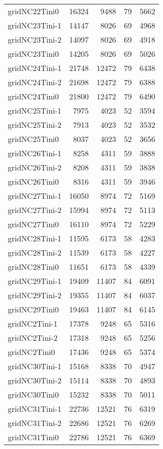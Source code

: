 \begin{longtable}{lrrrr}
gridNC22Tini0 & 16324 & 9488 & 79 & 5662 \\
gridNC23Tini-1 & 14147 & 8026 & 69 & 4968 \\
gridNC23Tini-2 & 14097 & 8026 & 69 & 4918 \\
gridNC23Tini0 & 14205 & 8026 & 69 & 5026 \\
gridNC24Tini-1 & 21748 & 12472 & 79 & 6438 \\
gridNC24Tini-2 & 21698 & 12472 & 79 & 6388 \\
gridNC24Tini0 & 21800 & 12472 & 79 & 6490 \\
gridNC25Tini-1 & 7975 & 4023 & 52 & 3594 \\
gridNC25Tini-2 & 7913 & 4023 & 52 & 3532 \\
gridNC25Tini0 & 8037 & 4023 & 52 & 3656 \\
gridNC26Tini-1 & 8258 & 4311 & 59 & 3888 \\
gridNC26Tini-2 & 8208 & 4311 & 59 & 3838 \\
gridNC26Tini0 & 8316 & 4311 & 59 & 3946 \\
gridNC27Tini-1 & 16050 & 8974 & 72 & 5169 \\
gridNC27Tini-2 & 15994 & 8974 & 72 & 5113 \\
gridNC27Tini0 & 16110 & 8974 & 72 & 5229 \\
gridNC28Tini-1 & 11595 & 6173 & 58 & 4283 \\
gridNC28Tini-2 & 11539 & 6173 & 58 & 4227 \\
gridNC28Tini0 & 11651 & 6173 & 58 & 4339 \\
gridNC29Tini-1 & 19409 & 11407 & 84 & 6091 \\
gridNC29Tini-2 & 19355 & 11407 & 84 & 6037 \\
gridNC29Tini0 & 19463 & 11407 & 84 & 6145 \\
gridNC2Tini-1 & 17378 & 9248 & 65 & 5316 \\
gridNC2Tini-2 & 17318 & 9248 & 65 & 5256 \\
gridNC2Tini0 & 17436 & 9248 & 65 & 5374 \\
gridNC30Tini-1 & 15168 & 8338 & 70 & 4947 \\
gridNC30Tini-2 & 15114 & 8338 & 70 & 4893 \\
gridNC30Tini0 & 15232 & 8338 & 70 & 5011 \\
gridNC31Tini-1 & 22736 & 12521 & 76 & 6319 \\
gridNC31Tini-2 & 22686 & 12521 & 76 & 6269 \\
gridNC31Tini0 & 22786 & 12521 & 76 & 6369 \\

\end{longtable}
